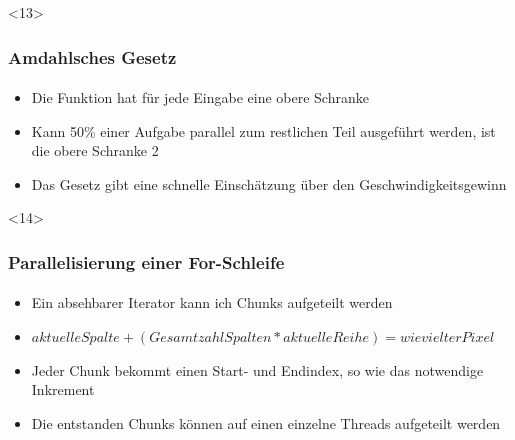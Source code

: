 \documentclass{beamer}
\begin{document}
\begin{frame}<13>
  \frametitle{Amdahlsches Gesetz}
  \framesubtitle{}

    \begin{itemize}
    \item  Die Funktion hat für jede Eingabe eine obere Schranke
    \item  Kann 50\% einer Aufgabe parallel zum restlichen Teil ausgeführt werden, ist die obere Schranke 2
    \item  Das Gesetz gibt eine schnelle Einschätzung über den Geschwindigkeitsgewinn
  \end{itemize}
  
\end{frame}

\begin{frame}<14>
  \frametitle{Parallelisierung einer For-Schleife}
  \framesubtitle{}
  
  \begin{itemize}
    \item  Ein absehbarer Iterator kann ich Chunks aufgeteilt werden
    \item  $aktuelle Spalte+(Gesamtzahl Spalten*aktuelle Reihe) = wievielter Pixel$
    \item  Jeder Chunk bekommt einen Start- und Endindex, so wie das notwendige Inkrement 
    \item  Die entstanden Chunks können auf einen einzelne Threads aufgeteilt werden
  \end{itemize}

\end{frame}
\end{document}
